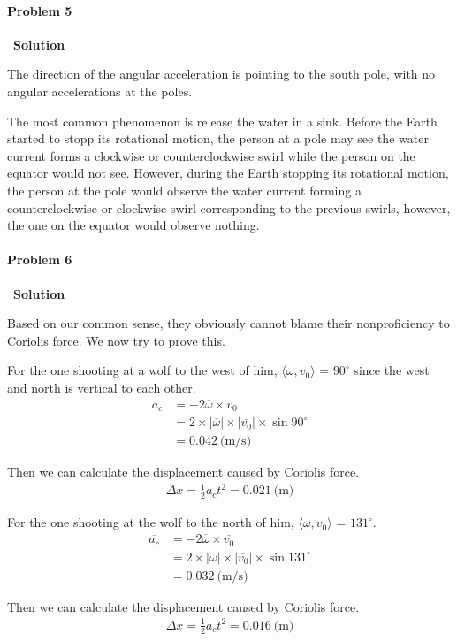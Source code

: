 \documentclass[12pt,a4paper]{article}
\begin{document}
\paragraph{\large \textbf{Problem 5}}~{\textbf{Solution}}
\vspace{2mm}
\par The direction of the angular acceleration is pointing to the south pole, with no angular accelerations at the poles.
\par The most common phenomenon is release the water in a sink. Before the Earth started to stopp its rotational motion, the person at a pole may see the water current forms a clockwise or counterclockwise swirl while the person on the equator would not see. However, during the Earth stopping its rotational motion, the person at the pole would observe the water current forming a counterclockwise or clockwise swirl corresponding to the previous swirls, however, the one on the equator would observe nothing.

\paragraph{\large \textbf{Problem 6}}~{\textbf{Solution}}
\vspace{2mm}
\par Based on our common sense, they obviously cannot blame their nonproficiency to Coriolis force. We now try to prove this.
\par For the one shooting at a wolf to the west of him, $\langle \omega, v_0 \rangle$ = $90^\circ$ since the west and north is vertical to each other.
\begin{align*}
	\overline{a_c} &= -2 \overline{\omega}\times \overline{v_0}\\
	&= 2\times |\overline{\omega}| \times |\overline{v_0}| \times \sin90^\circ\\
	&= 0.042\ \text{(m/s)}
\end{align*}
\par Then we can calculate the displacement caused by Coriolis force.
\begin{align*}
	\Delta x = \frac{1}{2}a_c t^2 = 0.021\ \text{(m)}
\end{align*}
\par For the one shooting at the wolf to the north of him, $\langle \omega, v_0 \rangle$ = $131^\circ$.
\begin{align*}
	\overline{a_c} &= -2 \overline{\omega}\times \overline{v_0}\\
	&= 2\times |\overline{\omega}| \times |\overline{v_0}| \times \sin131^\circ\\
	&= 0.032\ \text{(m/s)}
\end{align*}
\par Then we can calculate the displacement caused by Coriolis force.
\begin{align*}
	\Delta x = \frac{1}{2}a_c t^2 = 0.016\ \text{(m)}
\end{align*}
\end{document}
